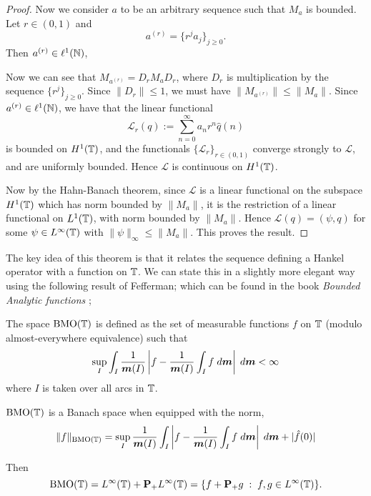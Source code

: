 \begin{proof}
    Now we consider $a$ to be an arbitrary sequence such that $M_a$ is bounded. Let $r \in (0,1)$
    and
    \begin{equation}
        a^{(r)} = \{r^ja_j\}_{j\geq 0}.
    \end{equation}
    Then $a^{(r)} \in \ell^1(\mathbb{N})$,
    
    Now we can see that $M_{a^{(r)}} = D_r M_a D_r$, where $D_r$
    is multiplication by the sequence $\{r^j\}_{j\geq 0}$. Since $\|D_r\| \leq 1$, 
    we must have $\|M_{a^{(r)}}\| \leq \|M_a\|$. Since $a^{(r)} \in \ell^1(\mathbb{N})$, 
    we have that the linear functional
    \begin{equation}
        \mathcal{L}_r(q) := \sum_{n=0}^\infty a_nr^n \hat{q}(n)
    \end{equation}
    is bounded on $H^1(\mathbb{T})$, and the functionals $\{\mathcal{L}_r\}_{r \in (0,1)}$
    converge strongly to $\mathcal{L}$, and are uniformly bounded. Hence $\mathcal{L}$
    is continuous on $H^1(\mathbb{T})$. 
    
    Now by the Hahn-Banach theorem, since $\mathcal{L}$ is a linear
    functional on the subspace $H^1(\mathbb{T})$ which has norm bounded
    by $\|M_a\|$, it is the restriction
    of a linear functional on $L^1(\mathbb{T})$, with norm bounded by $\|M_a\|$.
    Hence $\mathcal{L}(q) = (\psi,q)$ for some $\psi \in L^\infty(\mathbb{T})$
    with $\|\psi\|_\infty \leq \|M_a\|$. This proves the result.    
\end{proof}

The key idea of this theorem is that it relates the sequence defining
a Hankel operator with a function on $\mathbb{T}$. We can state this in a slightly more
elegant way using the following result of Fefferman; which
can be found in  the book \emph{Bounded Analytic functions} \cite[Cor 4.5, p.240]{Garnett};
\begin{proposition}
    The space $\operatorname{BMO}(\mathbb{T})$ is defined as the set of measurable
    functions $f$ on $\mathbb{T}$ (modulo almost-everywhere equivalence) such that
    \begin{equation}
        \sup_I \int_I \frac{1}{\boldsymbol{m}(I)}\left|f-\frac{1}{\boldsymbol{m}(I)}\int_I f\;d\boldsymbol{m}\right|\;d\boldsymbol{m} < \infty
    \end{equation}
    where $I$ is taken over all arcs in $\mathbb{T}$.
    
    $\operatorname{BMO}(\mathbb{T})$ is a Banach space when equipped with the norm,
    \begin{equation}
        \|f\|_{\operatorname{BMO}(\mathbb{T})} = \sup_I \frac{1}{\boldsymbol{m}(I)}\int_I \left|f-\frac{1}{\boldsymbol{m}(I)}\int_I f\;d\boldsymbol{m}\right|\;d\boldsymbol{m} + |\hat{f}(0)|
    \end{equation}
    
    Then 
    \begin{equation}
        \operatorname{BMO}(\mathbb{T}) = L^\infty(\mathbb{T})+\mathbf{P}_+L^\infty(\mathbb{T}) = \{f+\mathbf{P}_+g\;:\;f,g \in L^\infty(\mathbb{T})\}.
    \end{equation}
\end{proposition}

